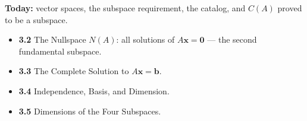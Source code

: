 \documentclass[aspectratio=169, 11pt]{beamer}
\newcommand{\xx}{\mathbf{x}}
\newcommand{\bb}{\mathbf{b}}
\newcommand{\zero}{\mathbf{0}}
\begin{document}
\begin{frame}[t, plain]
  \textbf{Today:} vector spaces, the subspace requirement, the catalog, and $C(A)$ proved to be a subspace.\\[8pt]
  \begin{itemize}
    \setlength{\itemsep}{4pt}
    \item \textbf{3.2} The Nullspace $N(A)$: all solutions of $A\xx=\zero$ --- the second fundamental subspace.
    \item \textbf{3.3} The Complete Solution to $A\xx=\bb$.
    \item \textbf{3.4} Independence, Basis, and Dimension.
    \item \textbf{3.5} Dimensions of the Four Subspaces.
  \end{itemize}
\end{frame}
\end{document}

